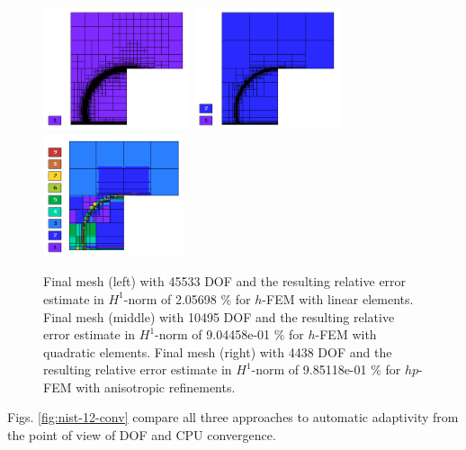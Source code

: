 \documentclass[12pt]{elsarticle}
\begin{document}
\begin{figure}[H]
\centering
\vspace{-5mm}
\includegraphics[height=3.6cm]{nist/nist-12/mesh_h1_aniso.png}
\includegraphics[height=3.6cm]{nist/nist-12/mesh_h2_aniso.png}
\includegraphics[height=3.6cm]{nist/nist-12/mesh_hp_aniso.png}
\vspace{-5mm}
\caption{
Final mesh (left) with 45533 DOF and the resulting
relative error estimate in $H^1$-norm of 2.05698 \% for $h$-FEM with linear elements.
Final mesh (middle) with 10495 DOF and the resulting
relative error estimate in $H^1$-norm of 9.04458e-01 \% for $h$-FEM with quadratic elements.
Final mesh (right) with 4438 DOF and the resulting
relative error estimate in $H^1$-norm of 9.85118e-01 \% for $hp$-FEM with anisotropic refinements.}
\vspace{-5mm}
\label{fig:nist-12-hp-aniso}
\end{figure}

Figs. \ref{fig:nist-12-conv} compare all
three approaches to automatic adaptivity from the point
of view of DOF and CPU convergence.
\end{document}
